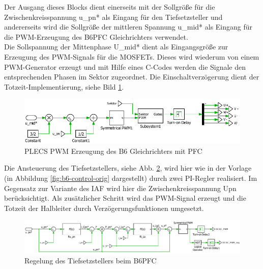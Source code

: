 			Der Ausgang dieses Blocks dient einerseits mit der Sollgröße für die Zwischenkreisspannung u\_pn* als Eingang für den Tiefsetzsteller und andererseits wird die Sollgröße der mittleren Spannung u\_mid* als Eingang für die PWM-Erzeugung des \gls{B6PFC} Gleichrichters verwendet.\\
			Die Sollspannung der Mittenphase U\_mid* dient als Eingangsgröße zur Erzeugung des PWM-Signals für die \gls{MOSFET}s. Dieses wird wiederum von einem PWM-Generator erzeugt und mit Hilfe eines C-Codes werden die Signale den entsprechenden Phasen im Sektor zugeordnet. Die Einschaltverzögerung dient der Totzeit-Implementierung, siehe Bild \ref{fig:plecsb6controlpwmmid}.\\
			\begin{figure}
				\centering
				\includegraphics[width=0.9\linewidth]{content/Grafiken/PLECS_B6_ControlPWMmid}
				\caption{PLECS PWM Erzeugung des B6 Gleichrichters mit \gls{PFC}}
				\label{fig:plecsb6controlpwmmid}
			\end{figure}
			Die Ansteuerung des Tiefsetzstellers, siehe Abb. \ref{fig:b6buckcontrol}, wird hier wie in der Vorlage (in Abbildung \ref{fig:b6-control-orig} dargestellt) durch zwei PI-Regler realisiert. Im Gegensatz zur Variante des \gls{IAF} wird hier die Zwischenkreisspannung \gls{Upn} berücksichtigt. Als zusätzlicher Schritt wird das PWM-Signal erzeugt und die Totzeit der Halbleiter durch Verzögerungsfunktionen umgesetzt.  
		
		
\begin{figure}
	\centering
	\includegraphics[width=1\linewidth]{content/Grafiken/B6_Buck_Control}
	\caption{Regelung des Tiefsetzstellers beim \gls{B6PFC}}
	\label{fig:b6buckcontrol}
\end{figure}
			
			
